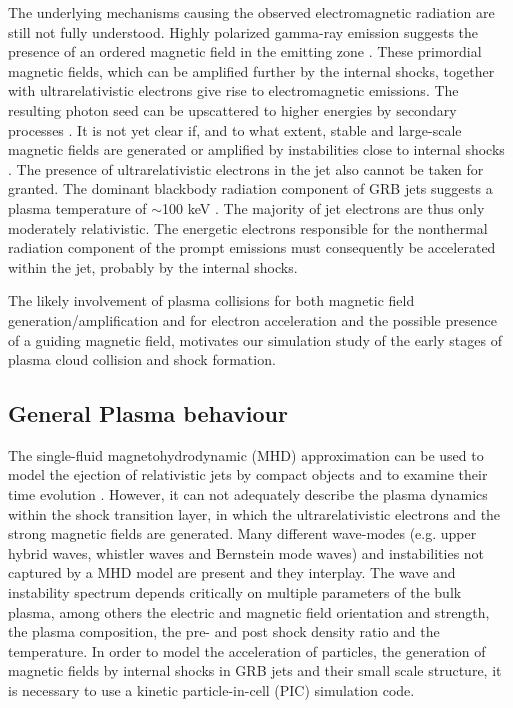 \documentclass[structabstract]{aa}
\begin{document}
The underlying mechanisms causing the observed electromagnetic radiation 
are still not fully understood. Highly polarized gamma-ray emission 
suggests the presence of an ordered magnetic field in the emitting zone 
\citep{Steele:2009uq}. These primordial magnetic fields, 
which can be amplified further by the internal shocks, together with 
ultrarelativistic electrons give rise to electromagnetic emissions. The 
resulting photon seed can be upscattered to higher energies by secondary 
processes \citep{Kirk:2010ys}. It is not yet clear if, and to what 
extent, stable and large-scale magnetic fields are generated or amplified 
by instabilities close to internal shocks 
\citep{Medvedev:1999sf,Brainerd:2000rz,Waxman:2006qy}. The presence of 
ultrarelativistic electrons in the jet also cannot be taken for granted. 
The dominant blackbody radiation component of GRB jets suggests a plasma 
temperature of $\sim$100 keV \citep{Ryde:2005rm}. The majority of jet 
electrons are thus only moderately relativistic. The energetic electrons 
responsible for the nonthermal radiation component of the prompt emissions 
\citep{Ryde:2005rm} must consequently be accelerated within the jet, probably 
by the internal shocks. 

The likely involvement of plasma collisions for both magnetic field 
generation/amplification and for electron acceleration and the possible presence of a guiding magnetic field, motivates
our simulation study of the early stages of plasma cloud collision and shock formation.


\subsection{General Plasma behaviour}

The single-fluid magnetohydrodynamic (MHD) approximation can be used
to model the ejection of relativistic jets by compact objects and to
examine their time evolution \citep{Nishikawa:2005yg}. However, it can
not adequately describe the plasma dynamics within the shock transition layer, in
which the ultrarelativistic electrons and the strong magnetic fields
are generated. Many different wave-modes (e.g. upper hybrid waves,
whistler waves and Bernstein mode waves) and instabilities \citep{Bret:2009ec} 
not captured by a MHD model are present and they interplay. The wave and 
instability spectrum depends critically on multiple parameters of the bulk 
plasma, among others the electric and magnetic field orientation and 
strength, the plasma composition, the pre- and post shock density ratio 
and the temperature. In order to model the acceleration of particles, 
the generation of magnetic fields by internal shocks in GRB jets and their 
small scale structure, it is necessary to use a kinetic particle-in-cell 
(PIC) simulation code.
\end{document}
